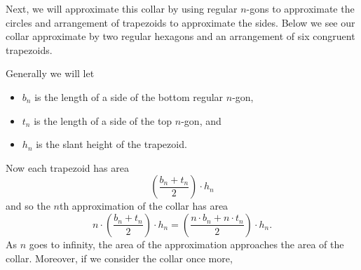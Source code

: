 \documentclass[hints,handout,noauthor,nooutcomes,12pt,newpage]{ximera}
\begin{document}
\begin{image}
\end{image}
Next, we will approximate this collar by using regular $n$-gons to
approximate the circles and arrangement of trapezoids to approximate
the sides. Below we see our collar approximate by two regular hexagons
and an arrangement of six congruent trapezoids. 
\begin{image}
\end{image}
Generally we will let
\begin{itemize}
\item $b_{n}$ is the length of a side of the bottom regular $n$-gon,
\item $t_{n}$ is the length of a side of the top $n$-gon, and
\item $h_{n}$ is the slant height of the trapezoid.
\end{itemize}
Now each trapezoid has area
\[
\left(  \frac{b_{n}+t_{n}}{2}\right)  \cdot h_{n}%
\]
and so the $n$th approximation of the collar has area
\[
n\cdot \left(  \frac{b_{n}+t_{n}}{2}\right)
\cdot h_{n}=\left(  \frac{n\cdot %
b_{n}+n\cdot t_{n}}{2}\right) \cdot h_{n}.
\]
As $n$ goes to infinity, the area of the approximation approaches the
area of the collar. Moreover, if we consider the collar once more,
\end{document}

